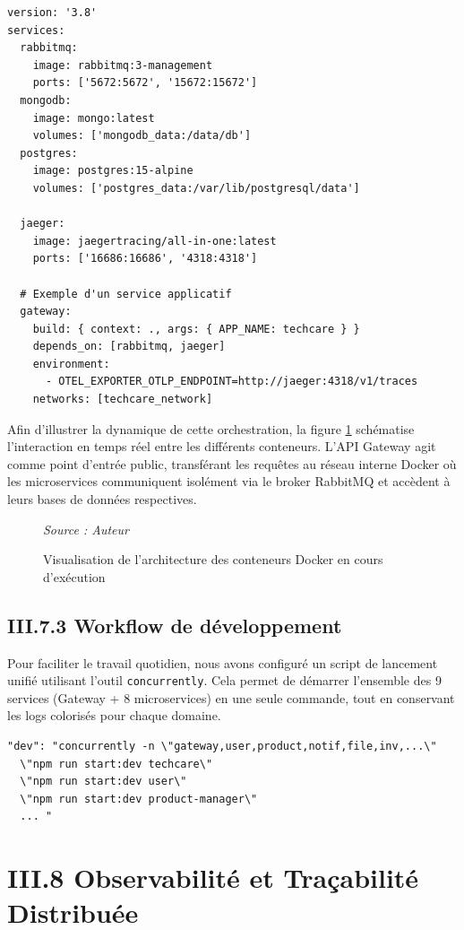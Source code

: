 \begin{verbatim}
version: '3.8'
services:
  rabbitmq:
    image: rabbitmq:3-management
    ports: ['5672:5672', '15672:15672']
  mongodb:
    image: mongo:latest
    volumes: ['mongodb_data:/data/db']
  postgres:
    image: postgres:15-alpine
    volumes: ['postgres_data:/var/lib/postgresql/data']
    
  jaeger:
    image: jaegertracing/all-in-one:latest
    ports: ['16686:16686', '4318:4318']
  
  # Exemple d'un service applicatif
  gateway:
    build: { context: ., args: { APP_NAME: techcare } }
    depends_on: [rabbitmq, jaeger]
    environment:
      - OTEL_EXPORTER_OTLP_ENDPOINT=http://jaeger:4318/v1/traces
    networks: [techcare_network]
\end{verbatim}

Afin d'illustrer la dynamique de cette orchestration, la figure \ref{fig:docker_communication} schématise l'interaction en temps réel entre les différents conteneurs. L'API Gateway agit comme point d'entrée public, transférant les requêtes au réseau interne Docker où les microservices communiquent isolément via le broker RabbitMQ et accèdent à leurs bases de données respectives.

\begin{figure}[H]
    \centering
    
    \caption{Visualisation de l'architecture des conteneurs Docker en cours d'exécution}
    \vspace{0.2cm}\small\textit{Source : Auteur}
    \label{fig:docker_communication}
\end{figure}


\subsection{III.7.3 Workflow de développement}
Pour faciliter le travail quotidien, nous avons configuré un script de lancement unifié utilisant l'outil \texttt{concurrently}. Cela permet de démarrer l'ensemble des 9 services (Gateway + 8 microservices) en une seule commande, tout en conservant les logs colorisés pour chaque domaine.

\begin{verbatim}
"dev": "concurrently -n \"gateway,user,product,notif,file,inv,...\" 
  \"npm run start:dev techcare\" 
  \"npm run start:dev user\" 
  \"npm run start:dev product-manager\" 
  ... "
\end{verbatim}


\section{III.8 Observabilité et Traçabilité Distribuée}
\label{sec:observability}


